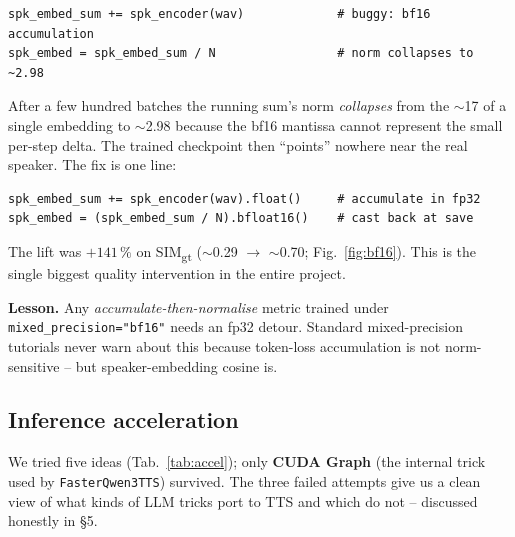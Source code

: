 \documentclass[10pt,a4paper]{article}
\begin{document}
\begin{lstlisting}[style=tinypy]
spk_embed_sum += spk_encoder(wav)             # buggy: bf16 accumulation
spk_embed = spk_embed_sum / N                 # norm collapses to ~2.98
\end{lstlisting}

After a few hundred batches the running sum's norm \emph{collapses} from the
$\sim$17 of a single embedding to $\sim$2.98 because the bf16 mantissa cannot
represent the small per-step delta. The trained checkpoint then ``points''
nowhere near the real speaker. The fix is one line:

\begin{lstlisting}[style=tinypy]
spk_embed_sum += spk_encoder(wav).float()     # accumulate in fp32
spk_embed = (spk_embed_sum / N).bfloat16()    # cast back at save
\end{lstlisting}

The lift was $+141\,\%$ on SIM\textsubscript{gt} ($\sim$0.29 $\to$
$\sim$0.70; Fig.~\ref{fig:bf16}). This is the single biggest quality
intervention in the entire project.

\begin{insightbox}\small
\textbf{Lesson.} Any \emph{accumulate-then-normalise} metric trained under
\texttt{mixed\_precision="bf16"} needs an fp32 detour. Standard
mixed-precision tutorials never warn about this because token-loss
accumulation is not norm-sensitive -- but speaker-embedding cosine is.
\end{insightbox}

\subsection{Inference acceleration}

We tried five ideas (Tab.~\ref{tab:accel}); only \textbf{CUDA Graph} (the
internal trick used by \texttt{FasterQwen3TTS}) survived. The three failed
attempts give us a clean view of what kinds of LLM tricks port to TTS and
which do not -- discussed honestly in \S5.
\end{document}
